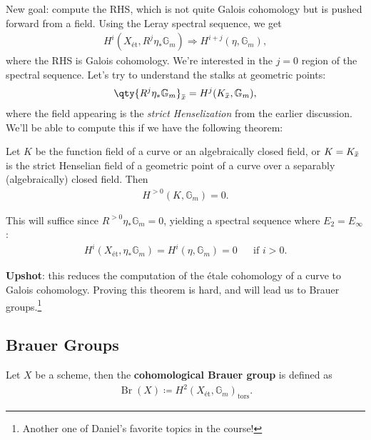 New goal: compute the RHS, which is not quite Galois cohomology but is
pushed forward from a field. Using the Leray spectral sequence, we get
\begin{align*}  
H^i(X_\text{ét}, R^j \eta_* {\mathbb{G}}_m)
\Rightarrow
H^{i+j}(\eta, {\mathbb{G}}_m)
,\end{align*}
where the RHS is Galois cohomology. We're interested in the \(j=0\)
region of the spectral sequence. Let's try to understand the stalks at
geometric points:
\begin{align*}  
\qty{R^j \eta_* {\mathbb{G}}_m}_{\mkern 1.5mu\overline{\mkern-1.5mux\mkern-1.5mu}\mkern 1.5mu}
=
H^j(K_{\mkern 1.5mu\overline{\mkern-1.5mux\mkern-1.5mu}\mkern 1.5mu}, {\mathbb{G}}_m)
,\end{align*}
where the field appearing is the \emph{strict Henselization} from the
earlier discussion. We'll be able to compute this if we have the
following theorem:

\begin{theorem}[?]

Let \(K\) be the function field of a curve or an algebraically closed
field, or
\(K = K_{\mkern 1.5mu\overline{\mkern-1.5mux\mkern-1.5mu}\mkern 1.5mu}\)
is the strict Henselian field of a geometric point of a curve over a
separably (algebraically) closed field. Then
\begin{align*}  
H^{>0}(K, {\mathbb{G}}_m) = 0
.\end{align*}

\end{theorem}

This will suffice since \(R^{>0} \eta_*{\mathbb{G}}_m = 0\), yielding a
spectral sequence where \(E_2 = E_ \infty\):
\begin{align*}  
H^i(X_\text{ét}, \eta_* {\mathbb{G}}_m)
=
H^i(\eta,{\mathbb{G}}_m)
=
0 && \text{if }i>0
.\end{align*}

\textbf{Upshot}: this reduces the computation of the étale cohomology of
a curve to Galois cohomology. Proving this theorem is hard, and will
lead us to Brauer groups.\footnote{Another one of Daniel's favorite
  topics in the course!}

\hypertarget{brauer-groups}{%
\subsection{Brauer Groups}\label{brauer-groups}}

\begin{definition}

Let \(X\) be a scheme, then the \textbf{cohomological Brauer group} is
defined as
\begin{align*}  
\operatorname{Br}(X) \coloneqq H^2(X_\text{ét}, {\mathbb{G}}_m)_{{\operatorname{tors}}}
.\end{align*}

\end{definition}

